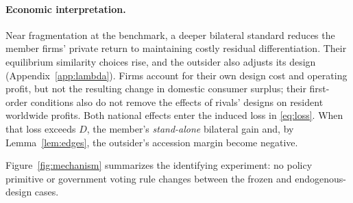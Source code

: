 \documentclass[11pt,a4paper]{article}
\theoremstyle{remark}\newtheorem{remark}[theorem]{Remark}
\begin{document}
\paragraph{Economic interpretation.}
Near fragmentation at the benchmark, a deeper bilateral standard reduces the member firms' private return to maintaining costly residual differentiation. Their equilibrium similarity choices rise, and the outsider also adjusts its design (Appendix~\ref{app:lambda}). Firms account for their own design cost and operating profit, but not the resulting change in domestic consumer surplus; their first-order conditions also do not remove the effects of rivals' designs on resident worldwide profits. Both national effects enter the induced loss in \eqref{eq:loss}. When that loss exceeds $D$, the member's \emph{stand-alone} bilateral gain and, by Lemma~\ref{lem:edges}, the outsider's accession margin become negative.

Figure~\ref{fig:mechanism} summarizes the identifying experiment: no policy primitive or government voting rule changes between the frozen and endogenous-design cases.
\end{document}
